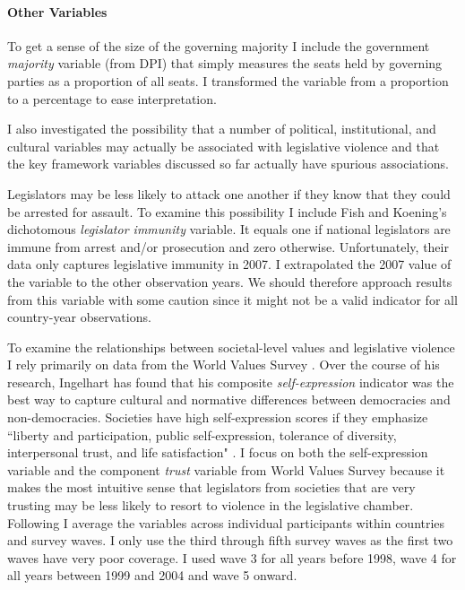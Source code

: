 \documentclass[a4paper]{article}\usepackage{graphicx, color}
\begin{document}
\paragraph{Other Variables}

To get a sense of the size of the governing majority I include the government {\emph{majority}} variable (from DPI) that simply measures the seats held by governing parties as a proportion of all seats. I transformed the variable from a proportion to a percentage to ease interpretation. 

I also investigated the possibility that a number of political, institutional, and cultural variables may actually be associated with legislative violence and that the key framework variables discussed so far actually have spurious associations. 

Legislators may be less likely to attack one another if they know that they could be arrested for assault. To examine this possibility I include Fish and Koening's \citeyearpar{Fish2009} dichotomous \emph{legislator immunity} variable. It equals one if national legislators are immune from arrest and/or prosecution and zero otherwise. Unfortunately, their data only captures legislative immunity in 2007. I extrapolated the 2007 value of the variable to the other observation years. We should therefore approach results from this variable with some caution since it might not be a valid indicator for all country-year observations.

To examine the relationships between societal-level values and legislative violence I rely primarily on data from the World Values Survey \citep{WVS2009}. Over the course of his research, Ingelhart has found that his composite {\emph{self-expression}} indicator was the best way to capture cultural and normative differences between democracies and non-democracies. Societies have high self-expression scores if they emphasize ``liberty and participation, public self-expression, tolerance of diversity, interpersonal trust, and life satisfaction" \citep[64]{Inglehart2003}. I focus on both the self-expression variable and the component {\emph{trust}} variable from World Values Survey because it makes the most intuitive sense that legislators from societies that are very trusting may be less likely to resort to violence in the legislative chamber. Following \cite{Inglehart2003} I average the variables across individual participants within countries and survey waves. I only use the third through fifth survey waves as the first two waves have very poor coverage. I used wave 3 for all years before 1998, wave 4 for all years between 1999 and 2004 and wave 5 onward. 
\end{document}

